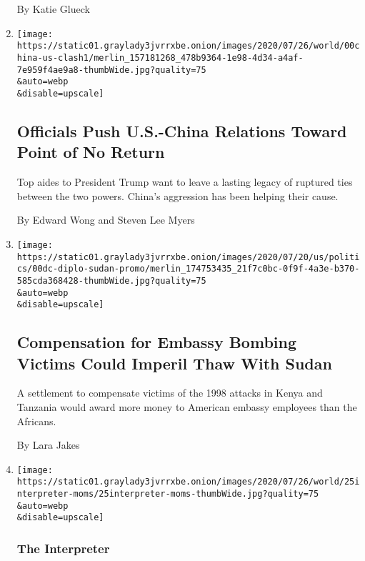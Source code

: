 \begin{enumerate}
  By Katie Glueck
\item
  \href{/2020/07/25/world/asia/us-china-trump-xi.html}{}

  \texttt{[image: https://static01.graylady3jvrrxbe.onion/images/2020/07/26/world/00china-us-clash1/merlin\_157181268\_478b9364-1e98-4d34-a4af-7e959f4ae9a8-thumbWide.jpg?quality=75\\\&auto=webp\\\&disable=upscale]}

  \hypertarget{officials-push-us-china-relations-toward-point-of-no-return}{%
  \subsection{Officials Push U.S.-China Relations Toward Point of No
  Return}\label{officials-push-us-china-relations-toward-point-of-no-return}}

  Top aides to President Trump want to leave a lasting legacy of
  ruptured ties between the two powers. China's aggression has been
  helping their cause.

  By Edward Wong and Steven Lee Myers
\item
  \href{/2020/07/25/us/politics/sudan-compensation-embassy-bombings.html}{}

  \texttt{[image: https://static01.graylady3jvrrxbe.onion/images/2020/07/20/us/politics/00dc-diplo-sudan-promo/merlin\_174753435\_21f7c0bc-0f9f-4a3e-b370-585cda368428-thumbWide.jpg?quality=75\\\&auto=webp\\\&disable=upscale]}

  \hypertarget{compensation-for-embassy-bombing-victims-could-imperil-thaw-with-sudan}{%
  \subsection{Compensation for Embassy Bombing Victims Could Imperil
  Thaw With
  Sudan}\label{compensation-for-embassy-bombing-victims-could-imperil-thaw-with-sudan}}

  A settlement to compensate victims of the 1998 attacks in Kenya and
  Tanzania would award more money to American embassy employees than the
  Africans.

  By Lara Jakes
\item
  \href{/2020/07/25/world/americas/protest-moms-power-police.html}{}

  \texttt{[image: https://static01.graylady3jvrrxbe.onion/images/2020/07/26/world/25interpreter-moms/25interpreter-moms-thumbWide.jpg?quality=75\\\&auto=webp\\\&disable=upscale]}

  \hypertarget{the-interpreter}{%
  \subsubsection{The Interpreter}\label{the-interpreter}}


\end{enumerate}
